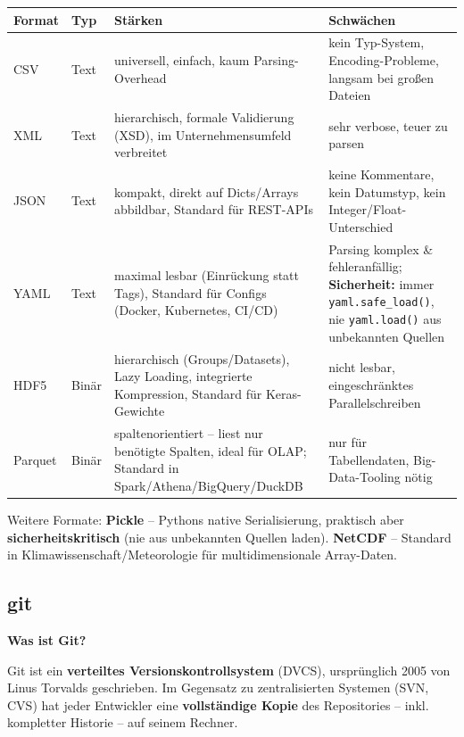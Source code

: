 \begin{table}[H]
  \centering
  \begin{tabularx}{\linewidth}{L{1.8cm} L{1.3cm} L{6cm} L{5cm}}
    \textbf{Format} & \textbf{Typ} & \textbf{Stärken} & \textbf{Schwächen} \\
    \midrule
    CSV & Text & universell, einfach, kaum Parsing-Overhead & kein Typ-System, Encoding-Probleme, langsam bei großen Dateien \\
    XML & Text & hierarchisch, formale Validierung (XSD), im Unternehmensumfeld verbreitet & sehr verbose, teuer zu parsen \\
    JSON & Text & kompakt, direkt auf Dicts/Arrays abbildbar, Standard für REST-APIs & keine Kommentare, kein Datumstyp, kein Integer/Float-Unterschied \\
    YAML & Text & maximal lesbar (Einrückung statt Tags), Standard für Configs (Docker, Kubernetes, CI/CD) & Parsing komplex \& fehleranfällig; \textbf{Sicherheit:} immer \texttt{yaml.safe\_load()}, nie \texttt{yaml.load()} aus unbekannten Quellen \\
    HDF5 & Binär & hierarchisch (Groups/Datasets), Lazy Loading, integrierte Kompression, Standard für Keras-Gewichte & nicht lesbar, eingeschränktes Parallelschreiben \\
    Parquet & Binär & spaltenorientiert -- liest nur benötigte Spalten, ideal für OLAP; Standard in Spark/Athena/BigQuery/DuckDB & nur für Tabellendaten, Big-Data-Tooling nötig \\
  \end{tabularx}
\end{table}

Weitere Formate: \textbf{Pickle} -- Pythons native Serialisierung, praktisch aber \textbf{sicherheitskritisch} (nie aus unbekannten Quellen laden). \textbf{NetCDF} -- Standard in Klimawissenschaft/Meteorologie für multidimensionale Array-Daten.

\newpage

\subsection{git}

\textbf{Was ist Git?}

Git ist ein \textbf{verteiltes Versionskontrollsystem} (DVCS), ursprünglich 2005 von Linus Torvalds geschrieben. Im Gegensatz zu zentralisierten Systemen (SVN, CVS) hat jeder Entwickler eine \textbf{vollständige Kopie} des Repositories -- inkl. kompletter Historie -- auf seinem Rechner.

